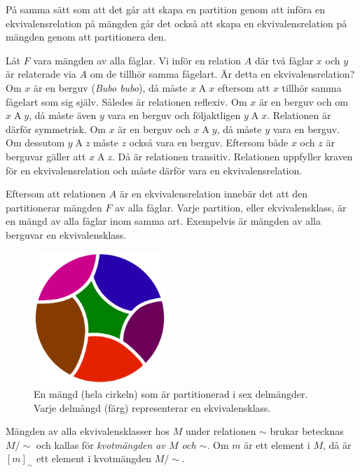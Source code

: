 På samma sätt som att det går att skapa en partition genom att införa en
ekvivalensrelation på mängden går det också att skapa en ekvivalensrelation på
mängden genom att partitionera den.

\begin{example}
  Låt \(F\) vara mängden av alla fåglar.
  Vi inför en relation \(A\) där två fåglar \(x\) och \(y\) är relaterade via
  \(A\) om de tillhör samma fågelart.
  Är detta en ekvivalensrelation?
  Om \(x\) är en berguv (\emph{Bubo bubo}), då måste \(x\mathop A x\) eftersom 
  att \(x\) tillhör samma fågelart som sig själv.
  Således är relationen reflexiv.
  Om \(x\) är en berguv och om \(x\mathop A y\), då måste även \(y\) vara en 
  berguv och följaktligen \(y\mathop A x\).
  Relationen är därför symmetrisk.
  Om \(x\) är en berguv och \(x\mathop A y\), då måste \(y\) vara en berguv.
  Om dessutom \(y\mathop A z\) måste \(z\) också vara en berguv.
  Eftersom både \(x\) och \(z\) är berguvar gäller att \(x\mathop A z\).
  Då är relationen transitiv.
  Relationen uppfyller kraven för en ekvivalensrelation och måste
  därför vara en ekvivalensrelation.

  Eftersom att relationen \(A\) är en ekvivalensrelation innebär det att den
  partitionerar mängden \(F\) av alla fåglar.
  Varje partition, eller ekvivalensklass, är en mängd av alla fåglar inom
  samma art.
  Exempelvis är mängden av alla berguvar en ekvivalensklass.
\end{example}

\begin{figure}
  \includegraphics[width=5cm]{figs/set_partition.pdf}
  \caption{%
    En mängd (hela cirkeln) som är partitionerad i sex delmängder.
    Varje delmängd (färg) representerar en ekvivalensklass.
  }\label{fig:setPartition}
\end{figure}

Mängden av alla ekvivalensklasser hos \(M\) under relationen \(\sim\)
brukar betecknas \(M/\!\sim\) och kallas för \emph{kvotmängden av \(M\)
och \(\sim\)}.
Om \(m\) är ett element i \(M\), då är \([m]_\sim\) ett element i kvotmängden
\(M/\!\sim\).


